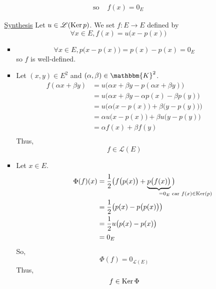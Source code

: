 \begin{itemize}
\begin{itemize}
\begin{align*}
					\text{so }& f(x) = 0_E
				\end{align*}
			\item[\underline{\sc Synthesis}] Let $u \in \mathcal{L}(\operatorname{Ker} p)$. We set $f : E \to E$ defined by \[
					\forall x \in E, f(x) = u\big(x - p(x)\big)
				\]
				\begin{itemize}
					\item \[\forall x \in E, p\big(x-p(x)\big) = p(x) - p(x) = 0_E\]
						so $f$ is well-defined.
					\item Let $(x,y) \in E^2$ and $(\alpha, \beta) \in \mathbbm{K}^2$.
						\begin{align*}
							f(\alpha x + \beta y) &= u\big(\alpha x + \beta y - p(\alpha x + \beta y) \big) \\
							&= u\big(\alpha x + \beta y - \alpha p(x) - \beta p(y)\big) \\
							&= u\big(\alpha \big(x - p(x)\big) + \beta \big(y - p(y)\big)\big)\\
							&= \alpha u\big(x - p(x)\big) + \beta u\big(y - p(y)\big) \\
							&= \alpha f(x) + \beta f(y) \\
						\end{align*}
						Thus, \[
							f \in \mathcal{L}(E)
						\]
					\item Let $x \in E$.
						\begin{align*}
							\Phi(f)(x) &= \frac{1}{2}\big(f\big(p(x)\big) + \underbrace{p\big(f(x)\big)}_{\mathrlap{=0_E \text{ car } f(x) \in \Ker(p)}}\big)  \\
							&= \frac{1}{2}\big(p(x) - p\big(p(x)\big)\big) \\
							&= \frac{1}{2}u\big(p(x) - p(x)\big) \\
							&= 0_E \\
						\end{align*}
						So,  \[
							\Phi(f) = 0_{\mathcal{L}(E)}
						\] Thus, \[
							f \in \operatorname{Ker} \Phi
						\]
				\end{itemize}
		\end{itemize}
\end{itemize}
